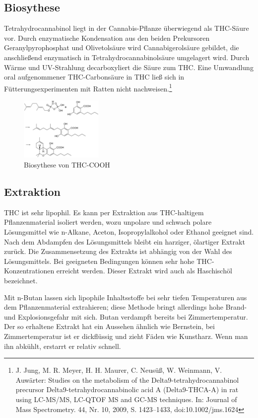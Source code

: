 \documentclass[openany]{scrbook}
\begin{document}
\subsection{Biosythese}
	Tetrahydrocannabinol liegt in der Cannabis-Pflanze überwiegend als THC-Säure vor. Durch enzymatische Kondensation aus den beiden Prekursoren Geranylpyrophosphat und Olivetolsäure wird Cannabigerolsäure gebildet, die anschließend enzymatisch in Tetrahydrocannabinolsäure umgelagert wird. Durch Wärme und UV-Strahlung decarboxyliert die Säure zum THC. Eine Umwandlung oral aufgenommener THC-Carbonsäure in THC ließ sich in Fütterungsexperimenten mit Ratten nicht nachweisen.\footnote[2]{J. Jung, M. R. Meyer, H. H. Maurer, C. Neusüß, W. Weinmann, V. Auwärter: Studies on the metabolism of the Delta9-tetrahydrocannabinol precursor Delta9-tetrahydrocannabinolic acid A (Delta9-THCA-A) in rat using LC-MS/MS, LC-QTOF MS and GC-MS techniques. In: Journal of Mass Spectrometry. 44, Nr. 10, 2009, S. 1423–1433, doi:10.1002/jms.1624}
	
\begin{figure}[h]
	\centering
	\includegraphics[width=4cm]{abb3}
	\caption{Biosythese von THC-COOH}
	\label{fig:800px-THC_biosynthesis}
\end{figure}

\subsection{Extraktion}
	THC ist sehr lipophil. Es kann per Extraktion aus THC-haltigem Pflanzenmaterial isoliert werden, wozu unpolare und schwach polare Lösungsmittel wie n-Alkane, Aceton, Isopropylalkohol oder Ethanol geeignet sind. Nach dem Abdampfen des Lösungsmittels bleibt ein harziger, ölartiger Extrakt zurück. Die Zusammensetzung des Extrakts ist abhängig von der Wahl des Lösungsmittels. Bei geeigneten Bedingungen können sehr hohe THC-Konzentrationen erreicht werden. Dieser Extrakt wird auch als Haschischöl bezeichnet.
	
	Mit n-Butan lassen sich lipophile Inhaltsstoffe bei sehr tiefen Temperaturen aus dem Pflanzenmaterial extrahieren; diese Methode bringt allerdings hohe Brand- und Explosionsgefahr mit sich. Butan verdampft bereits bei Zimmertemperatur. Der so erhaltene Extrakt hat ein Aussehen ähnlich wie Bernstein, bei Zimmertemperatur ist er dickflüssig und zieht Fäden wie Kunstharz. Wenn man ihn abkühlt, erstarrt er relativ schnell.
	
\end{document}
